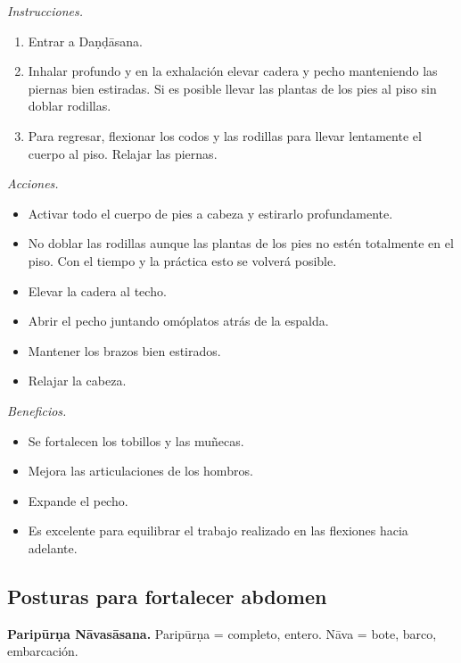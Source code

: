 \emph{Instrucciones.}
\begin{enumerate}
\item Entrar a Daṇḍāsana.
\item Inhalar profundo y en la exhalación
elevar cadera y pecho manteniendo las piernas
bien estiradas. Si es posible llevar las
plantas de los pies al piso sin doblar
rodillas.
\item Para regresar, flexionar los codos y
las rodillas para llevar lentamente el cuerpo
al piso. Relajar las piernas.
\end{enumerate}

\emph{Acciones.}
\begin{itemize}
\item Activar todo el cuerpo de pies a cabeza
y estirarlo profundamente.
\item No doblar las rodillas aunque las
plantas de los pies no estén totalmente en el
piso. Con el tiempo y la práctica esto se
volverá posible.
\item Elevar la cadera al techo.
\item Abrir el pecho juntando omóplatos atrás
de la espalda.
\item Mantener los brazos bien estirados.
\item Relajar la cabeza.
\end{itemize}

\emph{Beneficios.}
\begin{itemize}
\item Se fortalecen los tobillos y las
muñecas.
\item Mejora las articulaciones de los
hombros.
\item Expande el pecho.
\item Es excelente para equilibrar el trabajo
realizado en las flexiones hacia adelante.
\end{itemize}

\subsection{Posturas para fortalecer abdomen}
\label{section-posturas-abdomen}

\medskip\noindent\textbf{Paripūrṇa
Nāvasāsana.}
Paripūrṇa = completo, entero. Nāva = bote,
barco, embarcación.

